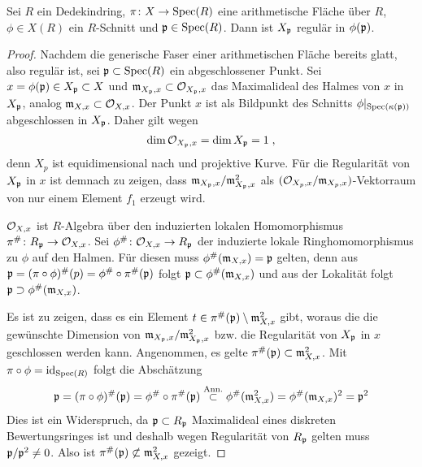 \begin{Lemma}\label{thm:arithflschnittbilderglatt}
  Sei $R$ ein Dedekindring,
  $\pi\colon X\to\operatorname{Spec}(R)$ eine arithmetische Fläche über $R$,
  $\phi\in X(R)$ ein $R$-Schnitt und $\mathfrak{p}\in\operatorname{Spec}(R)$.
  Dann ist $X_{\mathfrak{p}}$ regulär in $\phi(\mathfrak{p})$.
  \begin{proof}
    Nachdem die generische Faser einer arithmetischen Fläche bereits
    glatt, also regulär ist, sei $\mathfrak{p}\subset\operatorname{Spec}(R)$ ein abgeschlossener
    Punkt.
    Sei $x=\phi(\mathfrak{p})\in X_{\mathfrak{p}}\subset X$ und $\mathfrak{m}_{X_{\mathfrak{p}},x}\subset\mathcal{O}_{X_{\mathfrak{p}},x}$
    das Maximalideal des Halmes von $x$ in $X_{\mathfrak{p}}$,
    analog $\mathfrak{m}_{X,x}\subset\mathcal{O}_{X,x}$.
    Der Punkt $x$ ist als Bildpunkt des Schnitts
    $\phi|_{\operatorname{Spec}(\kappa(\mathfrak{p}))}$ abgeschlossen in $X_{\mathfrak{p}}$.
    Daher gilt wegen \cite[Corollary 2.5.24]{liu}
    \begin{gather*}
      \dim\mathcal{O}_{X_{\mathfrak{p}},x}=\dim X_{\mathfrak{p}}=1\;,
    \end{gather*}
    denn $X_p$ ist equidimensional nach
    \cite[Proposition 4.4.16]{liu} und projektive Kurve.
    Für die Regularität von $X_{\mathfrak{p}}$ in $x$ ist demnach zu zeigen,
    dass $\mathfrak{m}_{X_{\mathfrak{p}},x}/\mathfrak{m}_{X_{\mathfrak{p}},x}^2$ als $(\mathcal{O}_{X_p,x}/\mathfrak{m}_{X_p,x})$-Vektorraum
    von nur einem Element $f_1$ erzeugt wird.
    
    $\mathcal{O}_{X,x}$ ist $R$-Algebra über den induzierten lokalen
    Homomorphismus $\pi^\#\colon R_{\mathfrak{p}}\to\mathcal{O}_{X,x}$.
    Sei $\phi^\#\colon\mathcal{O}_{X,x}\to R_{\mathfrak{p}}$ der induzierte lokale
    Ringhomomorphismus zu $\phi$ auf den Halmen. Für diesen muss
    $\phi^\#(\mathfrak{m}_{X,x})=\mathfrak{p}$ gelten, denn aus
    $\mathfrak{p}=(\pi\circ\phi)^\#(p)=\phi^\#\circ\pi^\#(\mathfrak{p})$ folgt
    $\mathfrak{p}\subset\phi^\#(\mathfrak{m}_{X,x})$ und aus der Lokalität folgt
    $\mathfrak{p}\supset\phi^\#(\mathfrak{m}_{X,x})$.
    
    Es ist zu zeigen, dass es ein Element
    $t\in\pi^\#(\mathfrak{p})\setminus\mathfrak{m}_{X,x}^2$ gibt, woraus die
    die gewünschte Dimension von $\mathfrak{m}_{X_{\mathfrak{p}},x}/\mathfrak{m}_{X_{\mathfrak{p}},x}^2$
    bzw. die Regularität von $X_{\mathfrak{p}}$ in $x$ geschlossen werden kann.
    Angenommen, es gelte $\pi^\#(\mathfrak{p})\subset\mathfrak{m}_{X,x}^2$.
    Mit $\pi\circ\phi=\mathrm{id}_{\operatorname{Spec}(R)}$ folgt die Abschätzung
    \begin{gather*}
      \mathfrak{p} = (\pi\circ\phi)^\#(\mathfrak{p})
      = \phi^\#\circ\pi^\#(\mathfrak{p})
      \overset{\text{Ann.}}{\subset} \phi^\#(\mathfrak{m}_{X,x}^2)
      = \phi^\#(\mathfrak{m}_{X,x})^2
      = \mathfrak{p}^2
    \end{gather*}
    Dies ist ein Widerspruch, da $\mathfrak{p}\subset R_{\mathfrak{p}}$ Maximalideal eines
    diskreten Bewertungsringes ist und deshalb wegen Regularität von
    $R_{\mathfrak{p}}$ gelten muss $\mathfrak{p}/\mathfrak{p}^2\neq 0$.
    Also ist $\pi^\#(\mathfrak{p})\not\subset\mathfrak{m}_{X,x}^2$ gezeigt.


\end{proof}
\end{Lemma}
